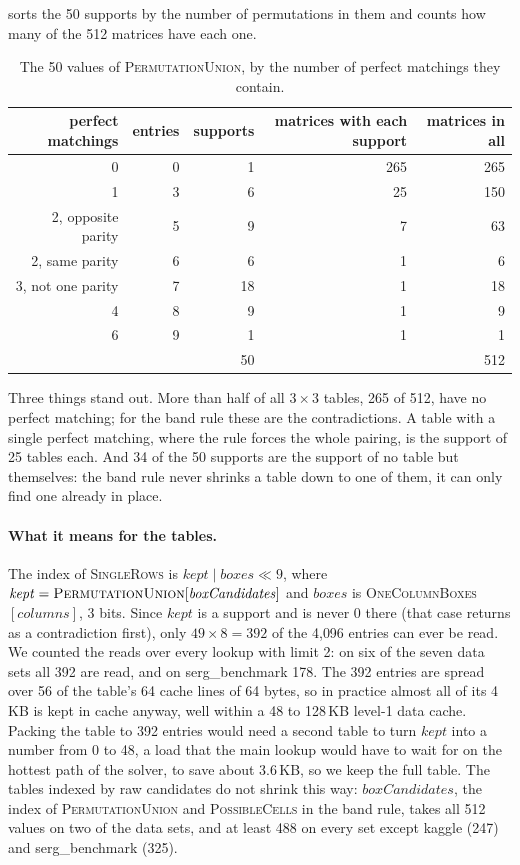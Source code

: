 \documentclass[11pt]{article}
\theoremstyle{definition}
\theoremstyle{plain}
\let\origtextsc\textsc
\renewcommand{\textsc}[1]{\textup{\origtextsc{#1}}}
\begin{document}
 sorts the 50 supports by the number of permutations in them and counts how many of the 512 matrices
have each one.

\begin{table}[h]
\centering
\caption{The 50 values of \textsc{PermutationUnion}, by the number of perfect matchings they contain.}
\label{tab:fifty}
\small
\begin{tabular}{rrrrr}
\toprule
perfect matchings & entries & supports & matrices with each support & matrices in all \\
\midrule
0 & 0 & 1 & 265 & 265 \\
1 & 3 & 6 & 25 & 150 \\
2, opposite parity & 5 & 9 & 7 & 63 \\
2, same parity & 6 & 6 & 1 & 6 \\
3, not one parity & 7 & 18 & 1 & 18 \\
4 & 8 & 9 & 1 & 9 \\
6 & 9 & 1 & 1 & 1 \\
\midrule
 & & 50 & & 512 \\
\bottomrule
\end{tabular}
\end{table}

\noindent Three things stand out. More than half of all $3\times 3$ tables, 265 of 512, have no perfect matching; for
the band rule these are the contradictions. A table with a single perfect matching, where the rule forces the whole
pairing, is the support of 25 tables each. And 34 of the 50 supports are the support of no table but themselves: the band rule never shrinks a
table down to one of them, it can only find one already in place.

\paragraph{What it means for the tables.} The index of \textsc{SingleRows} is $\mathit{kept}\mid
\mathit{boxes}\ll 9$, where $\mathit{kept}=\textsc{PermutationUnion}[\mathit{boxCandidates}]$ and $\mathit{boxes}$ is
\textsc{OneColumnBoxes}$[\mathit{columns}]$, 3 bits. Since $\mathit{kept}$ is a support and is never 0 there (that case
returns as a contradiction first), only $49\times 8=392$ of the 4{,}096 entries can ever be read. We counted the reads
over every lookup with limit 2: on six of the seven data sets all 392 are read, and on serg\_benchmark 178. The 392
entries are spread over 56 of the table's 64 cache lines of 64 bytes, so in practice almost all of its 4\,KB is kept
in cache anyway, well within a 48 to 128\,KB level-1 data cache. Packing the table to 392 entries would need a second
table to turn $\mathit{kept}$ into a number from 0 to 48, a load that the main lookup would have to wait for on the
hottest path of the solver, to save about 3.6\,KB, so we keep the full table. The tables indexed by raw candidates do
not shrink this way: $\mathit{boxCandidates}$, the index of \textsc{PermutationUnion} and \textsc{PossibleCells} in the
band rule, takes all 512 values on two of the data sets, and at least 488 on every set except kaggle (247) and serg\_benchmark (325).
\end{document}
